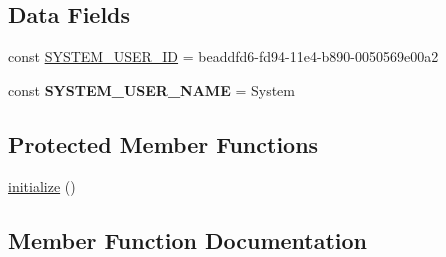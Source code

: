 \subsection*{Data Fields}
\begin{DoxyCompactItemize}
\item 
const \hyperlink{class_able_polecat___access_control___agent___user___system_aad521128c3cc2c96d3aaa271b70fb173}{S\+Y\+S\+T\+E\+M\+\_\+\+U\+S\+E\+R\+\_\+\+I\+D} = \textquotesingle{}beaddfd6-\/fd94-\/11e4-\/b890-\/0050569e00a2\textquotesingle{}
\item 
\hypertarget{class_able_polecat___access_control___agent___user___system_a83d96b90dc05138e01448ccb206e4177}{}const {\bfseries S\+Y\+S\+T\+E\+M\+\_\+\+U\+S\+E\+R\+\_\+\+N\+A\+M\+E} = \textquotesingle{}System\textquotesingle{}\label{class_able_polecat___access_control___agent___user___system_a83d96b90dc05138e01448ccb206e4177}

\end{DoxyCompactItemize}
\subsection*{Protected Member Functions}
\begin{DoxyCompactItemize}
\item 
\hyperlink{class_able_polecat___access_control___agent___user___system_a91098fa7d1917ce4833f284bbef12627}{initialize} ()
\end{DoxyCompactItemize}


\subsection{Member Function Documentation}
\hypertarget{class_able_polecat___access_control___agent___user___system_a91098fa7d1917ce4833f284bbef12627}{}
